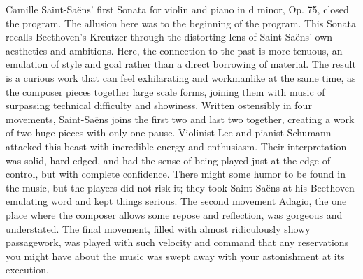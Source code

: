 Camille Saint-Saëns’ first Sonata for violin and piano in d minor, Op. 75, closed the program. The allusion here was to the beginning of the program. This Sonata recalls Beethoven’s Kreutzer through the distorting lens of Saint-Saëns’ own aesthetics and ambitions. Here, the connection to the past is more tenuous, an emulation of style and goal rather than a direct borrowing of material. The result is a curious work that can feel exhilarating and workmanlike at the same time, as the composer pieces together large scale forms, joining them with music of surpassing technical difficulty and showiness. Written ostensibly in four movements, Saint-Saëns joins the first two and last two together, creating a work of two huge pieces with only one pause. Violinist Lee and pianist Schumann attacked this beast with incredible energy and enthusiasm. Their interpretation was solid, hard-edged, and had the sense of being played just at the edge of control, but with complete confidence. There might some humor to be found in the music, but the players did not risk it; they took Saint-Saëns at his Beethoven-emulating word and kept things serious. The second movement Adagio, the one place where the composer allows some repose and reflection, was gorgeous and understated. The final movement, filled with almost ridiculously showy passagework, was played with such velocity and command that any reservations you might have about the music was swept away with your astonishment at its execution.